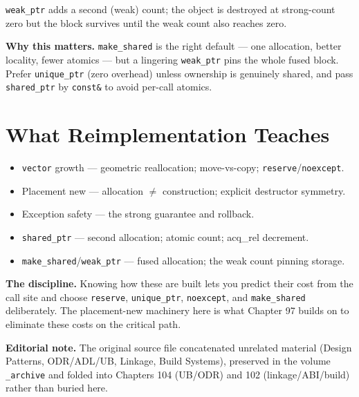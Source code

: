 \texttt{weak\_ptr} adds a second (weak) count; the object is destroyed at strong-count zero but the block survives until the weak count also reaches zero.

\textbf{Why this matters.} \texttt{make\_shared} is the right default --- one allocation, better locality, fewer atomics --- but a lingering \texttt{weak\_ptr} pins the whole fused block. Prefer \texttt{unique\_ptr} (zero overhead) unless ownership is genuinely shared, and pass \texttt{shared\_ptr} by \texttt{const\&} to avoid per-call atomics.

\section{What Reimplementation Teaches}
\begin{itemize}
\item \texttt{vector} growth --- geometric reallocation; move-vs-copy; \texttt{reserve}/\texttt{noexcept}.
\item Placement new --- allocation $\ne$ construction; explicit destructor symmetry.
\item Exception safety --- the strong guarantee and rollback.
\item \texttt{shared\_ptr} --- second allocation; atomic count; acq\_rel decrement.
\item \texttt{make\_shared}/\texttt{weak\_ptr} --- fused allocation; the weak count pinning storage.
\end{itemize}

\textbf{The discipline.} Knowing how these are built lets you predict their cost from the call site and choose \texttt{reserve}, \texttt{unique\_ptr}, \texttt{noexcept}, and \texttt{make\_shared} deliberately. The placement-new machinery here is what Chapter 97 builds on to eliminate these costs on the critical path.

\textbf{Editorial note.} The original source file concatenated unrelated material (Design Patterns, ODR/ADL/UB, Linkage, Build Systems), preserved in the volume \texttt{\_archive} and folded into Chapters 104 (UB/ODR) and 102 (linkage/ABI/build) rather than buried here.
